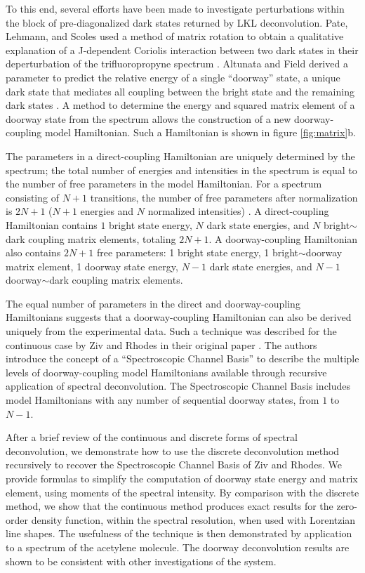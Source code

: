 \documentclass[12pt]{mitthesis}
\begin{document}
To this end, several efforts have been made to investigate
perturbations within the block of pre-diagonalized dark states
returned by LKL deconvolution.  Pate, Lehmann, and Scoles used a
method of matrix rotation to obtain a qualitative explanation of a
J-dependent Coriolis interaction between two dark states in their
deperturbation of the trifluoropropyne spectrum \cite{pate91}.
Altunata and Field derived a parameter to predict the relative energy
of a single ``doorway'' state, a unique dark state that mediates all
coupling between the bright state and the remaining dark states
\cite{altunata01}.  A method to determine the energy and squared
matrix element of a doorway state from the spectrum allows the
construction of a new doorway-coupling model Hamiltonian.  Such a
Hamiltonian is shown in figure \ref{fig:matrix}b.

The parameters in a direct-coupling Hamiltonian are uniquely
determined by the spectrum; the total number of energies and
intensities in the spectrum is equal to the number of free parameters
in the model Hamiltonian.  For a spectrum consisting of $N+1$
transitions, the number of free parameters after normalization is
$2N+1$ ($N+1$ energies and $N$ normalized intensities)
\cite{lawrance85}.  A direct-coupling Hamiltonian contains $1$ bright
state energy, $N$ dark state energies, and $N$ bright$\sim$dark
coupling matrix elements, totaling $2N+1$.  A doorway-coupling
Hamiltonian also contains $2N+1$ free parameters: 1 bright state
energy, 1 bright$\sim$doorway matrix element, 1 doorway state energy,
$N-1$ dark state energies, and $N-1$ doorway$\sim$dark coupling matrix
elements.

The equal number of parameters in the direct and doorway-coupling
Hamiltonians suggests that a doorway-coupling Hamiltonian can also be
derived uniquely from the experimental data.  Such a technique was
described for the continuous case by Ziv and Rhodes in their original
paper \cite{ziv76}.  The authors introduce the concept of a
``Spectroscopic Channel Basis'' to describe the multiple levels of
doorway-coupling model Hamiltonians available through recursive
application of spectral deconvolution.  The Spectroscopic Channel
Basis includes model Hamiltonians with any number of sequential
doorway states, from $1$ to $N-1$.

After a brief review of the continuous and discrete forms of spectral
deconvolution, we demonstrate how to use the discrete deconvolution
method recursively to recover the Spectroscopic Channel Basis of Ziv
and Rhodes.  We provide formulas to simplify the computation of
doorway state energy and matrix element, using moments of the spectral
intensity.  By comparison with the discrete method, we show that the
continuous method produces exact results for the zero-order density
function, within the spectral resolution, when used with Lorentzian
line shapes.  
The usefulness of
the technique is then demonstrated by application to a spectrum of the
acetylene molecule.  The doorway deconvolution results are shown to be
consistent with other investigations of the system.
\end{document}

